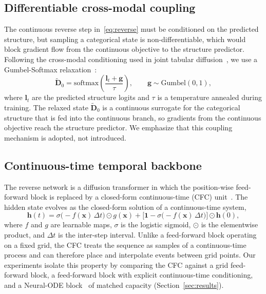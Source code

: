 \documentclass[review]{elsarticle}
\begin{document}
\subsection{Differentiable cross-modal coupling}
\label{sec:bridge}
The continuous reverse step in~\eqref{eq:reverse} must be conditioned on the predicted
structure, but sampling a categorical state is non-differentiable, which would block
gradient flow from the continuous objective to the structure predictor. Following the
cross-modal conditioning used in joint tabular diffusion~\cite{lee2023codi}, we use a
Gumbel-Softmax relaxation~\cite{jang2017gumbel}:
\begin{equation}
\tilde{\mathbf{D}}_0=\mathrm{softmax}\!\left(\frac{\mathbf{l}_t+\mathbf{g}}{\tau}\right),
\qquad \mathbf{g}\sim\mathrm{Gumbel}(0,1),
\end{equation}
where $\mathbf{l}_t$ are the predicted structure logits and $\tau$ is a temperature
annealed during training. The relaxed state $\tilde{\mathbf{D}}_0$ is a continuous surrogate
for the categorical structure that is fed into the continuous branch, so gradients from the
continuous objective reach the structure predictor. We emphasize that this coupling
mechanism is adopted, not introduced.

\subsection{Continuous-time temporal backbone}
\label{sec:cfc}
The reverse network is a diffusion transformer in which the position-wise feed-forward
block is replaced by a closed-form continuous-time (CFC) unit~\cite{hasani2022cfc,hasani2021ltc}.
The hidden state evolves as the closed-form solution of a continuous-time system,
\begin{equation}
\mathbf{h}(t)=\sigma\!\big(-f(\mathbf{x})\,\Delta t\big)\odot g(\mathbf{x})
+\big[\mathbf{1}-\sigma\!\big(-f(\mathbf{x})\,\Delta t\big)\big]\odot \mathbf{h}(0),
\end{equation}
where $f$ and $g$ are learnable maps, $\sigma$ is the logistic sigmoid, $\odot$ is the
elementwise product, and $\Delta t$ is the inter-step interval. Unlike a feed-forward block
operating on a fixed grid, the CFC treats the sequence as samples of a continuous-time
process and can therefore place and interpolate events between grid points. Our experiments
isolate this property by comparing the CFC against a grid feed-forward block, a
feed-forward block with explicit continuous-time conditioning, and a Neural-ODE
block~\cite{chen2018neuralode} of matched capacity (Section~\ref{sec:results}).
\end{document}
